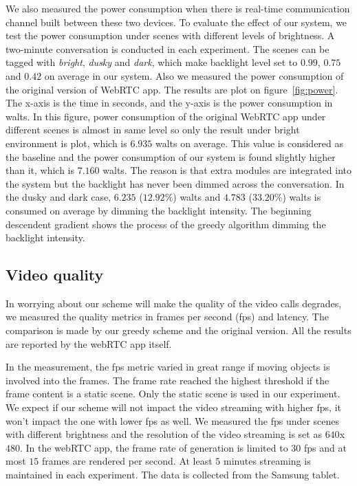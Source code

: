 We also measured the power consumption when there is real-time
communication channel built between these two devices. To evaluate the
effect of our system, we test the power consumption under scenes with
different levels of brightness. A two-minute conversation is conducted
in each experiment. The scenes can be tagged with {\it bright}, {\it
  dusky} and {\it dark}, which make backlight level set to $0.99$,
$0.75$ and $0.42$ on average in our system. Also we measured the power
consumption of the original version of WebRTC app. The results are
plot on figure~\ref{fig:power}. The x-axis is the time in seconds, and
the y-axis is the power consumption in walts. In this figure, power
consumption of the original WebRTC app under different scenes is
almost in same level so only the result under bright environment is
plot, which is $6.935$ walts on average. This value is considered as
the baseline and the power consumption of our system is found slightly
higher than it, which is $7.160$ walts. The reason is that extra
modules are integrated into the system but the backlight has never
been dimmed across the conversation. In the dusky and dark case,
$6.235$ ($12.92\%$) walts and $4.783$ ($33.20\%$) walts is consumed on
average by dimming the backlight intensity. The beginning descendent
gradient shows the process of the greedy algorithm dimming the
backlight intensity.


\subsection{Video quality}
In worrying about our scheme will make the quality of the video calls
degrades, we measured the quality metrics in frames per second (fps)
and latency. The comparison is made by our greedy scheme and the
original version. All the results are reported by the webRTC app
itself. 


In the measurement, the fps metric varied in great range if moving
objects is involved into the frames. The frame rate reached the
highest threshold if the frame content is a static scene. Only the
static scene is used in our experiment.  We expect if our scheme will
not impact the video streaming with higher fps, it won't impact the
one with lower fps as well. We measured the fps under scenes with
different brightness and the resolution of the video streaming is set as
$640$x$480$. In the webRTC app, the frame rate of generation is
limited to $30$ fps and at most $15$ frames are rendered per
second. At least $5$ minutes streaming is maintained in each
experiment. The data is collected from the Samsung tablet. 



